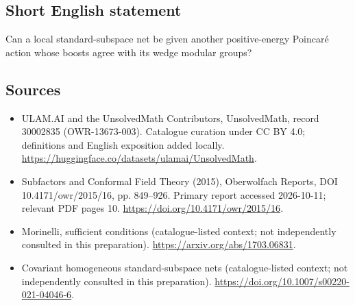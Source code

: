 \documentclass[11pt]{article}
\begin{document}
\subsection{Short English statement}
Can a local standard-subspace net be given another positive-energy Poincaré action whose boosts agree with its wedge modular groups?
\subsection{Sources}
\begin{itemize}
\item[\hypertarget{source:30002835:1}{S1}] ULAM.AI and the UnsolvedMath Contributors, UnsolvedMath, record 30002835 (OWR-13673-003). Catalogue curation under CC BY 4.0; definitions and English exposition added locally.
\url{https://huggingface.co/datasets/ulamai/UnsolvedMath}.
\item[\hypertarget{source:30002835:2}{S2}] Subfactors and Conformal Field Theory (2015), Oberwolfach Reports, DOI 10.4171/owr/2015/16, pp. 849--926. Primary report accessed 2026-10-11; relevant PDF pages 10.
\url{https://doi.org/10.4171/owr/2015/16}.
\item[\hypertarget{source:30002835:3}{S3}] Morinelli, sufficient conditions (catalogue-listed context; not independently consulted in this preparation).
\url{https://arxiv.org/abs/1703.06831}.
\item[\hypertarget{source:30002835:4}{S4}] Covariant homogeneous standard-subspace nets (catalogue-listed context; not independently consulted in this preparation).
\url{https://doi.org/10.1007/s00220-021-04046-6}.
\end{itemize}
\label{end:30002835}
\end{document}
